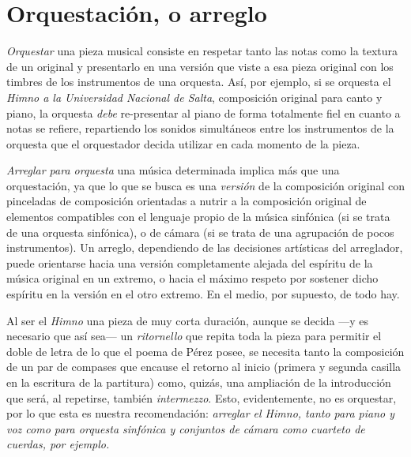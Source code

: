 \section{Orquestación, o arreglo}
\label{sec:orquestacion-arreglo}

\emph{Orquestar} una pieza musical consiste en respetar tanto las notas como la textura de un original y presentarlo en una versión que viste a esa pieza original con los timbres de los instrumentos de una orquesta. Así, por ejemplo, si se orquesta el \emph{Himno a la Universidad Nacional de Salta}, composición original para canto y piano, la orquesta \emph{debe} re-presentar al piano de forma totalmente fiel en cuanto a notas se refiere, repartiendo los sonidos simultáneos entre los instrumentos de la orquesta que el orquestador decida utilizar en cada momento de la pieza.

\emph{Arreglar para orquesta} una música determinada implica más que una orquestación, ya que lo que se busca es una \emph{versión} de la composición original con pinceladas de composición orientadas a nutrir a la composición original de elementos compatibles con el lenguaje propio de la música sinfónica (si se trata de una orquesta sinfónica), o de cámara (si se trata de una agrupación de pocos instrumentos). Un arreglo, dependiendo de las decisiones artísticas del arreglador, puede orientarse hacia una versión completamente alejada del espíritu de la música original en un extremo, o hacia el máximo respeto por sostener dicho espíritu en la versión en el otro extremo. En el medio, por supuesto, de todo hay.

Al ser el \emph{Himno} una pieza de muy corta duración, aunque se decida ---y es necesario que así sea--- un \emph{ritornello} que repita toda la pieza para permitir el doble de letra de lo que el poema de Pérez posee, se necesita tanto la composición de un par de compases que encause el retorno al inicio (primera y segunda casilla en la escritura de la partitura) como, quizás, una ampliación de la introducción que será, al repetirse, también \emph{intermezzo}. Esto, evidentemente, no es orquestar, por lo que esta es nuestra recomendación: \emph{arreglar el \emph{Himno}, tanto para piano y voz como para orquesta sinfónica y conjuntos de cámara como cuarteto de cuerdas, por ejemplo.}



%
%
